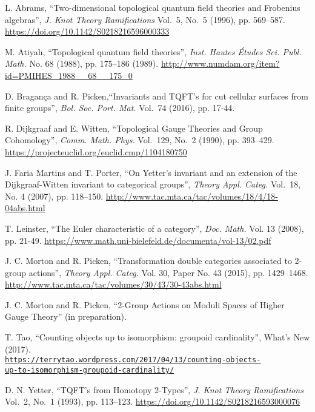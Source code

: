 \documentclass[a4paper,11pt]{article}
\begin{document}
\begin{thebibliography}{99}

 L. Abrams, ``Two-dimensional topological quantum field theories and Frobenius algebras'', 
\emph{J. Knot Theory Ramifications} Vol.~5, No.~5 (1996), pp. 569–587. 
\url{https://doi.org/10.1142/S0218216596000333}

 M. Atiyah, ``Topological quantum field theories'', \emph{Inst. Hautes Études Sci. Publ. Math.} No. 68 (1988), pp. 175–186 (1989). 
\url{http://www.numdam.org/item?id=PMIHES_1988__68__175_0}

 D. Bragança and R. Picken,``Invariants and TQFT’s for cut cellular surfaces from finite groups'',  \emph{Bol. Soc. Port. Mat.} Vol.~74 (2016), pp. 17-44.


 R. Dijkgraaf and E. Witten, ``Topological Gauge Theories and Group Cohomology'', \emph{Comm.  Math. Phys.} Vol.~129, No.~2 (1990), pp. 393–429. 
\url{https://projecteuclid.org/euclid.cmp/1104180750}

 J. Faria Martins and T. Porter, ``On Yetter's invariant and an extension of the Dijkgraaf-Witten invariant to categorical groups'', \emph{Theory Appl. Categ.} Vol.~18, No. 4 (2007), pp. 118–150. 
\url{http://www.tac.mta.ca/tac/volumes/18/4/18-04abs.html}

 T. Leinster, ``The Euler characteristic of a category'', \emph{ Doc. Math.} Vol. 13 (2008), pp. 21-49. 
\url{https://www.math.uni-bielefeld.de/documenta/vol-13/02.pdf}

 J. C. Morton and R. Picken, ``Transformation double categories associated to 2-group actions'', \emph{Theory Appl. Categ.} Vol. 30, Paper No. 43 (2015), pp. 1429–1468. 
\url{http://www.tac.mta.ca/tac/volumes/30/43/30-43abs.html}

 J. C. Morton and R. Picken, ``2-Group Actions on Moduli Spaces of Higher Gauge Theory'' (in preparation).

 T. Tao, ``Counting objects up to isomorphism: groupoid cardinality'', What's New (2017).\\
\href{https://terrytao.wordpress.com/2017/04/13/counting-objects-up-to-isomorphism-groupoid-cardinality/}{\nolinkurl{https://terrytao.wordpress.com/2017/04/13/counting-objects-}} \\
\href{https://terrytao.wordpress.com/2017/04/13/counting-objects-up-to-isomorphism-groupoid-cardinality/}{\nolinkurl{up-to-isomorphism-groupoid-cardinality/} }


 D. N. Yetter, ``TQFT’s from Homotopy 2-Types'', \emph{J. Knot Theory Ramifications} Vol.~2, No.~1 (1993), pp. 113–123.
\url{https://doi.org/10.1142/S0218216593000076}



\end{thebibliography}
\end{document}
